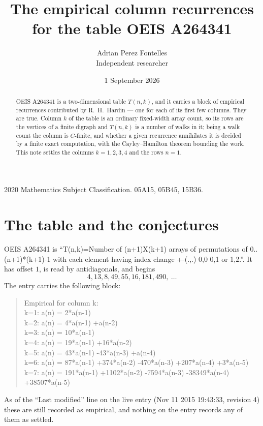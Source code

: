 \documentclass[11pt,a4paper]{article}
\title{The empirical column recurrences for the table OEIS A264341}
\author{Adrian Perez Fontelles\\ \small Independent researcher}
\date{1 September 2026}
\theoremstyle{plain}
\theoremstyle{definition}
\begin{document}
\maketitle

\begin{abstract}
OEIS A264341 is a two-dimensional table $T(n,k)$, and it carries a block of empirical
recurrences contributed by R.~H.~Hardin --- one for each of its first few columns. They are
true. Column $k$ of the table is an ordinary fixed-width array count, so its rows are the
vertices of a finite digraph and $T(n,k)$ is a number of walks in it; being a walk count the
column is $C$-finite, and whether a given recurrence annihilates it is decided by a finite
exact computation, with the Cayley--Hamilton theorem bounding the work. This note settles the columns $k=1, 2, 3, 4$ and the rows $n=1$.
\end{abstract}

\noindent\small 2020 Mathematics Subject Classification. 05A15, 05B45, 15B36.\normalsize

\section{The table and the conjectures}

OEIS A264341 is ``T(n,k)=Number of (n+1)X(k+1) arrays of permutations of 0..(n+1)*(k+1)-1 with each element having index change +-(.,.) 0,0 0,1 or 1,2.''. It has offset $1$, is
read by antidiagonals, and begins
\[
4, 13, 8, 49, 55, 16, 181, 490,\ \dots
\]
The entry carries the following block:
\begin{quote}\small
Empirical for column k:\\
k=1: a(n) = 2*a(n-1)\\
k=2: a(n) = 4*a(n-1) +a(n-2)\\
k=3: a(n) = 10*a(n-1)\\
k=4: a(n) = 19*a(n-1) +16*a(n-2)\\
k=5: a(n) = 43*a(n-1) -43*a(n-3) +a(n-4)\\
k=6: a(n) = 87*a(n-1) +374*a(n-2) -470*a(n-3) +207*a(n-4) +3*a(n-5)\\
k=7: a(n) = 191*a(n-1) +1102*a(n-2) -7594*a(n-3) -38349*a(n-4) +38507*a(n-5)\\
\end{quote}
As of the ``Last modified'' line on the live entry (Nov 11 2015 19:43:33, revision 4) these are still
recorded as empirical, and nothing on the entry records any of them as settled.
\end{document}
